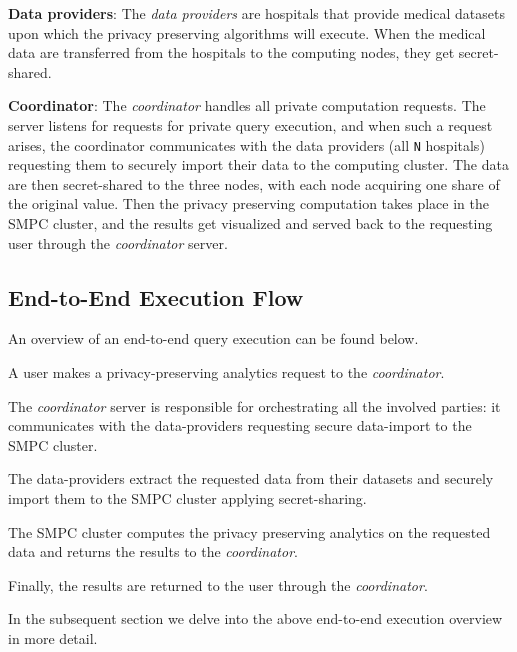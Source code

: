 \textbf{Data providers}: The \textit{data providers} are hospitals that provide medical datasets upon which the privacy preserving algorithms will execute.
When the medical data are transferred from the hospitals to the computing nodes, they get secret\hyp shared.


\textbf{Coordinator}: The \textit{coordinator} handles all private computation requests.
The server listens for requests for private query execution, and when such a request arises, the coordinator communicates with the data providers (all \texttt{N} hospitals) requesting them to securely import their data to the computing cluster.
The data are then secret\hyp shared to the three nodes, with each node acquiring one share of the original value.
Then the privacy preserving computation takes place in the SMPC cluster, and the results get visualized and served back to the requesting user through the \textit{coordinator} server.


\subsection{End-to-End Execution Flow}\label{ss:end-to-end-execution-flow}

An overview of an end\hyp to\hyp end query execution can be found below.

\begin{description}[labelwidth=4em, leftmargin=\dimexpr\labelwidth+\labelsep\relax]
    \item [Step 1:] A user makes a privacy\hyp preserving analytics request to the \textit{coordinator}.
    \item [Step 2:] The \textit{coordinator} server is responsible for orchestrating all the involved parties: it communicates with the data\hyp providers requesting secure data\hyp import to the SMPC cluster.
    \item [Step 3:] The data\hyp providers extract the requested data from their datasets and securely import them to the SMPC cluster applying secret\hyp sharing.
    \item [Step 4:] The SMPC cluster computes the privacy preserving analytics on the requested data and returns the results to the \textit{coordinator}.
    \item [Step 5:] Finally, the results are returned to the user through the \textit{coordinator}.
\end{description}

In the subsequent section we delve into the above end\hyp to\hyp end execution overview in more detail.

